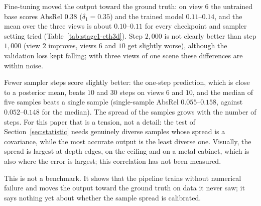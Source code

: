  Fine-tuning moved the output toward the ground truth: on view $6$ the untrained base scores AbsRel $0.38$ ($\delta_1=0.35$) and the trained model $0.11$--$0.14$, and the mean over the three views is about $0.10$--$0.11$ for every checkpoint and sampler setting tried (Table~\ref{tab:stage1-eth3d}).
Step $2{,}000$ is not clearly better than step $1{,}000$ (view $2$ improves, views $6$ and $10$ get slightly worse), although the validation loss kept falling; with three views of one scene these differences are within noise.

 Fewer sampler steps score slightly better: the one-step prediction, which is close to a posterior mean, beats $10$ and $30$ steps on views $6$ and $10$, and the median of five samples beats a single sample (single-sample AbsRel $0.055$--$0.158$, against $0.052$--$0.148$ for the median).
The spread of the samples grows with the number of steps.
For this paper that is a tension, not a detail: the test of Section~\ref{sec:statistic} needs genuinely diverse samples whose spread is a covariance, while the most accurate output is the least diverse one.
Visually, the spread is largest at depth edges, on the ceiling and on a metal cabinet, which is also where the error is largest; this correlation has not been measured.

This is not a benchmark.
It shows that the pipeline trains without numerical failure and moves the output toward the ground truth on data it never saw; it says nothing yet about whether the sample spread is calibrated.
